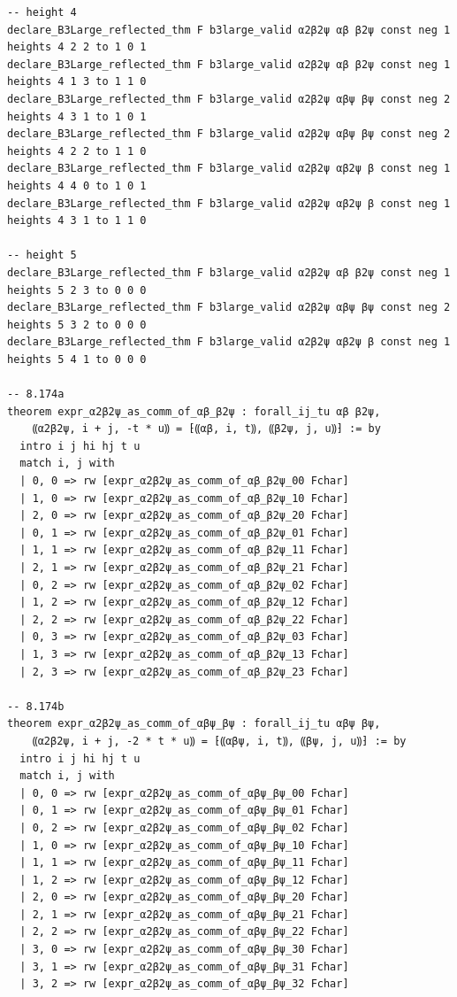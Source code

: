 \documentclass[10pt,a4paper]{article}
\begin{document}
\begin{Verbatim}
-- height 4
declare_B3Large_reflected_thm F b3large_valid α2β2ψ αβ β2ψ const neg 1 heights 4 2 2 to 1 0 1
declare_B3Large_reflected_thm F b3large_valid α2β2ψ αβ β2ψ const neg 1 heights 4 1 3 to 1 1 0
declare_B3Large_reflected_thm F b3large_valid α2β2ψ αβψ βψ const neg 2 heights 4 3 1 to 1 0 1
declare_B3Large_reflected_thm F b3large_valid α2β2ψ αβψ βψ const neg 2 heights 4 2 2 to 1 1 0
declare_B3Large_reflected_thm F b3large_valid α2β2ψ αβ2ψ β const neg 1 heights 4 4 0 to 1 0 1
declare_B3Large_reflected_thm F b3large_valid α2β2ψ αβ2ψ β const neg 1 heights 4 3 1 to 1 1 0

-- height 5
declare_B3Large_reflected_thm F b3large_valid α2β2ψ αβ β2ψ const neg 1 heights 5 2 3 to 0 0 0
declare_B3Large_reflected_thm F b3large_valid α2β2ψ αβψ βψ const neg 2 heights 5 3 2 to 0 0 0
declare_B3Large_reflected_thm F b3large_valid α2β2ψ αβ2ψ β const neg 1 heights 5 4 1 to 0 0 0

-- 8.174a
theorem expr_α2β2ψ_as_comm_of_αβ_β2ψ : forall_ij_tu αβ β2ψ,
    ⸨α2β2ψ, i + j, -t * u⸩ = ⁅⸨αβ, i, t⸩, ⸨β2ψ, j, u⸩⁆ := by
  intro i j hi hj t u
  match i, j with
  | 0, 0 => rw [expr_α2β2ψ_as_comm_of_αβ_β2ψ_00 Fchar]
  | 1, 0 => rw [expr_α2β2ψ_as_comm_of_αβ_β2ψ_10 Fchar]
  | 2, 0 => rw [expr_α2β2ψ_as_comm_of_αβ_β2ψ_20 Fchar]
  | 0, 1 => rw [expr_α2β2ψ_as_comm_of_αβ_β2ψ_01 Fchar]
  | 1, 1 => rw [expr_α2β2ψ_as_comm_of_αβ_β2ψ_11 Fchar]
  | 2, 1 => rw [expr_α2β2ψ_as_comm_of_αβ_β2ψ_21 Fchar]
  | 0, 2 => rw [expr_α2β2ψ_as_comm_of_αβ_β2ψ_02 Fchar]
  | 1, 2 => rw [expr_α2β2ψ_as_comm_of_αβ_β2ψ_12 Fchar]
  | 2, 2 => rw [expr_α2β2ψ_as_comm_of_αβ_β2ψ_22 Fchar]
  | 0, 3 => rw [expr_α2β2ψ_as_comm_of_αβ_β2ψ_03 Fchar]
  | 1, 3 => rw [expr_α2β2ψ_as_comm_of_αβ_β2ψ_13 Fchar]
  | 2, 3 => rw [expr_α2β2ψ_as_comm_of_αβ_β2ψ_23 Fchar]

-- 8.174b
theorem expr_α2β2ψ_as_comm_of_αβψ_βψ : forall_ij_tu αβψ βψ,
    ⸨α2β2ψ, i + j, -2 * t * u⸩ = ⁅⸨αβψ, i, t⸩, ⸨βψ, j, u⸩⁆ := by
  intro i j hi hj t u
  match i, j with
  | 0, 0 => rw [expr_α2β2ψ_as_comm_of_αβψ_βψ_00 Fchar]
  | 0, 1 => rw [expr_α2β2ψ_as_comm_of_αβψ_βψ_01 Fchar]
  | 0, 2 => rw [expr_α2β2ψ_as_comm_of_αβψ_βψ_02 Fchar]
  | 1, 0 => rw [expr_α2β2ψ_as_comm_of_αβψ_βψ_10 Fchar]
  | 1, 1 => rw [expr_α2β2ψ_as_comm_of_αβψ_βψ_11 Fchar]
  | 1, 2 => rw [expr_α2β2ψ_as_comm_of_αβψ_βψ_12 Fchar]
  | 2, 0 => rw [expr_α2β2ψ_as_comm_of_αβψ_βψ_20 Fchar]
  | 2, 1 => rw [expr_α2β2ψ_as_comm_of_αβψ_βψ_21 Fchar]
  | 2, 2 => rw [expr_α2β2ψ_as_comm_of_αβψ_βψ_22 Fchar]
  | 3, 0 => rw [expr_α2β2ψ_as_comm_of_αβψ_βψ_30 Fchar]
  | 3, 1 => rw [expr_α2β2ψ_as_comm_of_αβψ_βψ_31 Fchar]
  | 3, 2 => rw [expr_α2β2ψ_as_comm_of_αβψ_βψ_32 Fchar]


\end{Verbatim}
\end{document}
